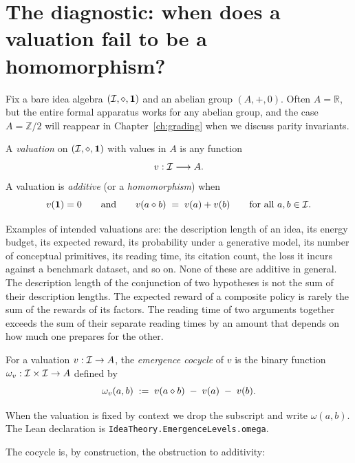 \section{The diagnostic: when does a valuation fail to be a homomorphism?}
\label{sec:diagnostic}

Fix a bare idea algebra $(\mathcal{I},\mathbin{\diamond},\mathbf{1})$ and an abelian group $(A, +, 0)$. Often $A
= \mathbb{R}$, but the entire formal apparatus works for any abelian group,
and the case $A = \mathbb{Z}/2$ will reappear in
Chapter~\ref{ch:grading} when we discuss parity invariants.

\begin{definition}[Valuation]\label{def:valuation}
A \emph{valuation} on $(\mathcal{I},\mathbin{\diamond},\mathbf{1})$ with values in $A$ is any function
\[
  v : \mathcal{I} \longrightarrow A.
\]
A valuation is \emph{additive} (or a \emph{homomorphism}) when
\[
  v(\mathbf{1}) = 0
  \qquad\text{and}\qquad
  v(a\mathbin{\diamond} b) \;=\; v(a) + v(b)
  \qquad\text{for all } a,b\in\mathcal{I}.
\]
\end{definition}

Examples of intended valuations are: the description length of an idea, its
energy budget, its expected reward, its probability under a generative
model, its number of conceptual primitives, its reading time, its citation
count, the loss it incurs against a benchmark dataset, and so on. None of
these are additive in general. The description length of the conjunction of
two hypotheses is not the sum of their description lengths. The expected
reward of a composite policy is rarely the sum of the rewards of its
factors. The reading time of two arguments together exceeds the sum of
their separate reading times by an amount that depends on how much one
prepares for the other.

\begin{definition}\label{def:omega}
For a valuation $v : \mathcal{I} \to A$, the \emph{emergence cocycle} of $v$ is
the binary function $\omega_v : \mathcal{I}\times\mathcal{I} \to A$ defined by
\begin{equation}\label{eq:omega-def}
  \omega_v(a,b) \;:=\; v(a\mathbin{\diamond} b) \;-\; v(a) \;-\; v(b).
\end{equation}
\end{definition}

When the valuation is fixed by context we drop the subscript and write
$\omega(a,b)$. The Lean declaration is
\texttt{IdeaTheory.EmergenceLevels.omega}.

The cocycle is, by construction, the obstruction to additivity:

